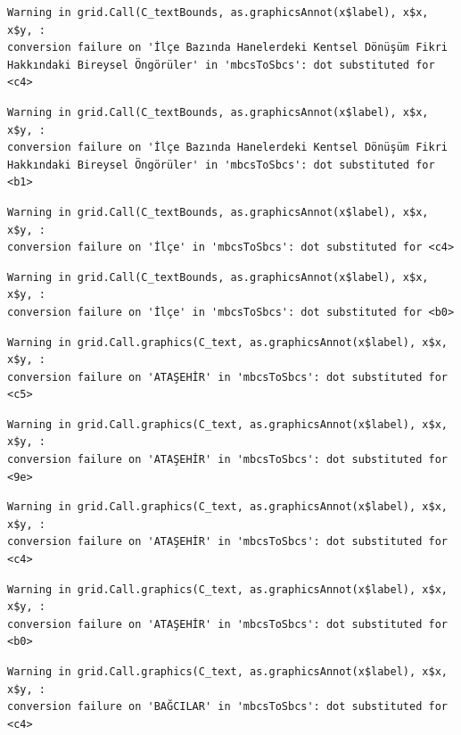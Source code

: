 \documentclass[
  11pt,
  a4paper,
  DIV=11,
  numbers=noendperiod]{scrartcl}
\begin{document}
\begin{verbatim}
Warning in grid.Call(C_textBounds, as.graphicsAnnot(x$label), x$x, x$y, :
conversion failure on 'İlçe Bazında Hanelerdeki Kentsel Dönüşüm Fikri
Hakkındaki Bireysel Öngörüler' in 'mbcsToSbcs': dot substituted for <c4>
\end{verbatim}

\begin{verbatim}
Warning in grid.Call(C_textBounds, as.graphicsAnnot(x$label), x$x, x$y, :
conversion failure on 'İlçe Bazında Hanelerdeki Kentsel Dönüşüm Fikri
Hakkındaki Bireysel Öngörüler' in 'mbcsToSbcs': dot substituted for <b1>
\end{verbatim}

\begin{verbatim}
Warning in grid.Call(C_textBounds, as.graphicsAnnot(x$label), x$x, x$y, :
conversion failure on 'İlçe' in 'mbcsToSbcs': dot substituted for <c4>
\end{verbatim}

\begin{verbatim}
Warning in grid.Call(C_textBounds, as.graphicsAnnot(x$label), x$x, x$y, :
conversion failure on 'İlçe' in 'mbcsToSbcs': dot substituted for <b0>
\end{verbatim}

\begin{verbatim}
Warning in grid.Call.graphics(C_text, as.graphicsAnnot(x$label), x$x, x$y, :
conversion failure on 'ATAŞEHİR' in 'mbcsToSbcs': dot substituted for <c5>
\end{verbatim}

\begin{verbatim}
Warning in grid.Call.graphics(C_text, as.graphicsAnnot(x$label), x$x, x$y, :
conversion failure on 'ATAŞEHİR' in 'mbcsToSbcs': dot substituted for <9e>
\end{verbatim}

\begin{verbatim}
Warning in grid.Call.graphics(C_text, as.graphicsAnnot(x$label), x$x, x$y, :
conversion failure on 'ATAŞEHİR' in 'mbcsToSbcs': dot substituted for <c4>
\end{verbatim}

\begin{verbatim}
Warning in grid.Call.graphics(C_text, as.graphicsAnnot(x$label), x$x, x$y, :
conversion failure on 'ATAŞEHİR' in 'mbcsToSbcs': dot substituted for <b0>
\end{verbatim}

\begin{verbatim}
Warning in grid.Call.graphics(C_text, as.graphicsAnnot(x$label), x$x, x$y, :
conversion failure on 'BAĞCILAR' in 'mbcsToSbcs': dot substituted for <c4>
\end{verbatim}
\end{document}
